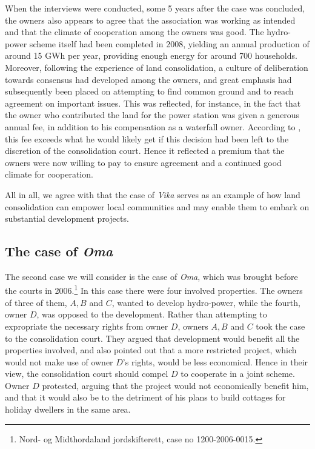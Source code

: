 When the interviews were conducted, some 5 years after the case was concluded, the owners also appears to agree that the association was working as intended and that the climate of cooperation among the owners was good. The hydro-power scheme itself had been completed in 2008, yielding an annual production of around 15 GWh per year, providing enough energy for around 700 households. Moreover, following the experience of land consolidation, a culture of deliberation towards consensus had developed among the owners, and great emphasis had subsequently been placed on attempting to find common ground and to reach agreement on important issues. This was reflected, for instance, in the fact that the owner who contributed the land for the power station was given a generous annual fee, in addition to his compensation as a waterfall owner. According to \cite{master}, this fee exceeds what he would likely get if this decision had been left to the discretion of the consolidation court. Hence it reflected a premium that the owners were now willing to pay to ensure agreement and a continued good climate for cooperation.

All in all, we agree with \cite{master} that the case of \emph{Vika} serves as an example of how land consolidation can empower local communities and may enable them to embark on substantial development projects.

\subsection{The case of \emph{Oma}}

The second case we will consider is the case of \emph{Oma}, which was brought before the courts in 2006.\footnote{Nord- og Midthordaland jordskifterett, case no 1200-2006-0015.} In this case there were four involved properties. The owners of three of them, $A,B$ and $C$, wanted to develop hydro-power, while the fourth, owner $D$, was opposed to the development. Rather than attempting to expropriate the necessary rights from owner $D$, owners $A,B$ and $C$ took the case to the consolidation court. They argued that development would benefit all the properties involved, and also pointed out that a more restricted project, which would not make use of owner $D$'s rights, would be less economical. Hence in their view, the consolidation court should compel $D$ to cooperate in a joint scheme. Owner $D$ protested, arguing that the project would not economically benefit him, and that it would also be to the detriment of his plans to build cottages for holiday dwellers in the same area.


